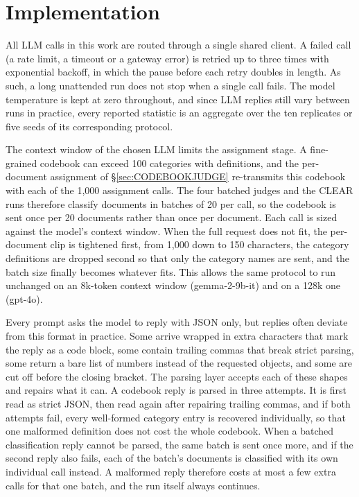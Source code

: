 \documentclass[11pt,a4paper,oneside]{report}
\begin{document}
\section{Implementation}\label{sec:implementation}

All LLM calls in this work are routed through a single shared client. A failed call (a rate limit, a timeout or a gateway error) is retried up to three times with exponential backoff, in which the pause before each retry doubles in length. As such, a long unattended run does not stop when a single call fails. The model temperature is kept at zero throughout, and since LLM replies still vary between runs in practice, every reported statistic is an aggregate over the ten replicates or five seeds of its corresponding protocol.

The context window of the chosen LLM limits the assignment stage. A fine-grained codebook can exceed 100 categories with definitions, and the per-document assignment of \S\ref{sec:CODEBOOKJUDGE} re-transmits this codebook with each of the 1{,}000 assignment calls. The four batched judges and the CLEAR runs therefore classify documents in batches of 20 per call, so the codebook is sent once per 20 documents rather than once per document. Each call is sized against the model's context window. When the full request does not fit, the per-document clip is tightened first, from 1{,}000 down to 150 characters, the category definitions are dropped second so that only the category names are sent, and the batch size finally becomes whatever fits. This allows the same protocol to run unchanged on an 8k-token context window ({\small\ttfamily gemma-2-9b-it}) and on a 128k one ({\small\ttfamily gpt-4o}).


Every prompt asks the model to reply with JSON only, but replies often deviate from this format in practice. Some arrive wrapped in extra characters that mark the reply as a code block, some contain trailing commas that break strict parsing, some return a bare list of numbers instead of the requested objects, and some are cut off before the closing bracket. The parsing layer accepts each of these shapes and repairs what it can. A codebook reply is parsed in three attempts. It is first read as strict JSON, then read again after repairing trailing commas, and if both attempts fail, every well-formed category entry is recovered individually, so that one malformed definition does not cost the whole codebook. When a batched classification reply cannot be parsed, the same batch is sent once more, and if the second reply also fails, each of the batch's documents is classified with its own individual call instead. A malformed reply therefore costs at most a few extra calls for that one batch, and the run itself always continues.
\end{document}
